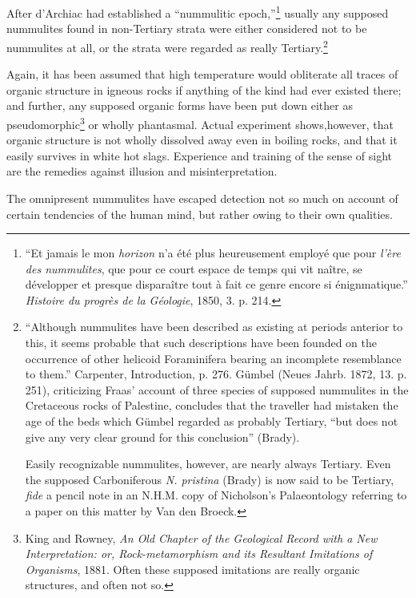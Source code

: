 \documentclass[a4paper, 12pt, oneside]{article}
\begin{document}
After d'Archiac had established a ``nummulitic epoch,''\footnote{``Et jamais le mon \emph{horizon} n'a été plus heureusement employé que pour \emph{l'ère des nummulites}, que pour ce court espace de temps qui vit naître, se développer et presque disparaître tout à fait ce genre encore si énignmatique.'' \emph{Histoire du progrès de la Géologie}, 1850, 3. p. 214.} usually any supposed nummulites found in non-Tertiary strata were either considered not to be nummulites at all, or the strata were regarded as really Tertiary.\footnote{``Although nummulites have been described as existing at periods anterior to this, it seems probable that such descriptions have been founded on the occurrence of other helicoid Foraminifera bearing an incomplete resemblance to them.'' Carpenter, Introduction, p. 276. Gümbel (Neues Jahrb. 1872, 13. p. 251), criticizing Fraas' account of three species of supposed nummulites in the Cretaceous rocks of Palestine, concludes that the traveller had mistaken the age of the beds which Gümbel regarded as probably Tertiary, ``but does not give any very clear ground for this conclusion'' (Brady).

Easily recognizable nummulites, however, are nearly always Tertiary. Even the supposed Carboniferous \emph{N. pristina} (Brady) is now said to be Tertiary, \emph{fide} a pencil note in an N.H.M. copy of Nicholson's Palaeontology referring to a paper on this matter by Van den Broeck.}

Again, it has been assumed that high temperature would obliterate all traces of organic structure in igneous rocks if anything of the kind had ever existed there; and further, any supposed organic forms have been put down either as pseudomorphic\footnote{King and Rowney, \emph{An Old Chapter of the Geological Record with a New Interpretation: or, Rock-metamorphism and its Resultant Imitations of Organisms}, 1881. Often these supposed imitations are really organic structures, and often not so.} or wholly phantasmal. Actual experiment shows,however, that organic structure is not wholly dissolved away even in boiling rocks, and that it easily survives in white hot slags. Experience and training of the sense of sight are the remedies against illusion and misinterpretation.

The omnipresent nummulites have escaped detection not so much on account of certain tendencies of the human mind, but rather owing to their own qualities.
\end{document}
